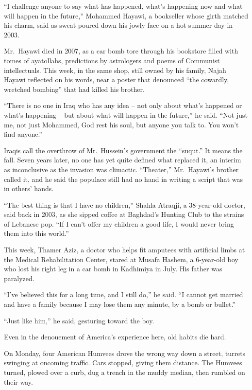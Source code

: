﻿\documentclass[12pt]{article}
\begin{document}
``I challenge anyone to say what has happened, what's happening now and what will happen in the
future,'' Mohammed Hayawi, a bookseller whose girth matched his charm, said as sweat poured down his
jowly face on a hot summer day in 2003.

Mr.~Hayawi died in 2007, as a car bomb tore through his bookstore filled with tomes of ayatollahs,
predictions by astrologers and poems of Communist intellectuals. This week, in the same shop, still
owned by his family, Najah Hayawi reflected on his words, near a poster that denounced ``the
cowardly, wretched bombing'' that had killed his brother.

``There is no one in Iraq who has any idea -- not only about what's happened or what's happening --
but about what will happen in the future,'' he said. ``Not just me, not just Mohammed, God rest his
soul, but anyone you talk to. You won't find anyone.''

Iraqis call the overthrow of Mr.~Hussein's government the ``suqut.'' It means the fall. Seven years
later, no one has yet quite defined what replaced it, an interim as inconclusive as the invasion was
climactic. ``Theater,'' Mr.~Hayawi's brother called it, and he said the populace still had no hand
in writing a script that was in others' hands.

``The best thing is that I have no children,'' Shahla Atraqji, a 38-year-old doctor, said back in
2003, as she sipped coffee at Baghdad's Hunting Club to the strains of Lebanese pop. ``If I can't
offer my children a good life, I would never bring them into this world.''

This week, Thamer Aziz, a doctor who helps fit amputees with artificial limbs at the Medical
Rehabilitation Center, stared at Musafa Hashem, a 6-year-old boy who lost his right leg in a car
bomb in Kadhimiya in July. His father was paralyzed.

``I've believed this for a long time, and I still do,'' he said. ``I cannot get married and have a
family because I may lose them any minute, by a bomb or bullet.''

``Just like him,'' he said, gesturing toward the boy.

Even in the denouement of America's experience here, old habits die hard.

On Monday, four American Humvees drove the wrong way down a street, turrets swinging at oncoming
traffic. Cars stopped, giving them distance. The Humvees turned, plowed over a curb, dug a trench in
the muddy median, then rumbled on their way.
\end{document}
